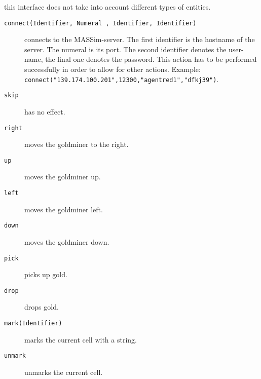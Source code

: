 \documentclass[a4]{article}
\begin{document}
 this interface does not take into account different types of entities.

\medskip{}
\begin{description}
\item[\texttt{connect(Identifier, Numeral , Identifier, Identifier)}] connects to the MASSim-server.
The first identifier is the hostname of the server. The numeral is its port. The second identifier denotes the user-name,
the final one denotes the password. This action has to be performed successfully in order to allow for other actions.
Example: \texttt{connect("139.174.100.201",12300,"agentred1","dfkj39")}.
\item[\texttt{skip}] has no effect.
\item[\texttt{right}] moves the goldminer to the right.
\item[\texttt{up}] moves the goldminer up.
\item[\texttt{left}] moves the goldminer left.
\item[\texttt{down}] moves the goldminer down.
\item[\texttt{pick}] picks up gold.
\item[\texttt{drop}] drops gold.
\item[\texttt{mark(Identifier)}] marks the current cell with a string.
\item[\texttt{unmark}] unmarks the current cell.

\end{description}
\end{document}
